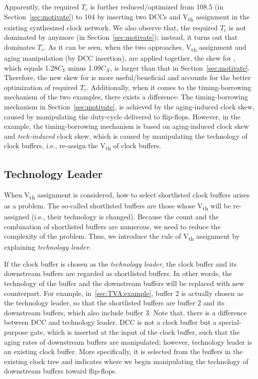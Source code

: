 Apparently, the required $T_c$ is further reduced/optimized from 108.5 (in Section~\ref{sec:motivate}) to 104 by inserting two DCCs and V\textsubscript{th} assignment in the existing synthesized clock network. We also observe that, the required $T_c$ is not dominated by  anymore (in Section~\ref{sec:motivate}); instead, it turns out that  dominates $T_c$. As it can be seen, when the two approaches, V\textsubscript{th} assignment and aging manipulation  (by DCC insertion), are applied together, the skew for , which equals 1.28$C_Y$ minus 1.09$C_X$, is larger than that in Section~\ref{sec:motivate}. Therefore, the new skew for  is more useful/beneficial and accounts for the better optimization of required $T_c$. 
Additionally, when it comes to the timing-borrowing mechanism of the two examples, there exists a difference: The timing-borrowing mechanism in Section~\ref{sec:motivate}, is achieved by the aging-induced clock skew, caused by manipulating the duty-cycle delivered to flip-flops. However, in the example, the timing-borrowing mechanism is based on aging-induced clock skew and \textit{tech-induced} clock skew, which is caused by manipulating the technology of clock buffers, i.e., re-assign the V\textsubscript{th} of clock buffers. 

\subsection{Technology Leader}
\label{sec:TVA:leader}
When V\textsubscript{th} assignment is considered, how to select shortlisted clock buffers arises as a problem. The so-called shortlisted buffers are those whose V\textsubscript{th} will be re-assigned (i.e., their technology is changed). Because the count and the combination of shortlisted buffers are numerous, we need to reduce the complexity of the problem. Thus, we introduce the rule of V\textsubscript{th} assignment by explaining \textit{technology leader}. 

If the clock buffer is chosen as the \textit{technology leader}, the clock buffer and its downstream buffers are regarded as shortlisted buffers. In other words, the technology of the buffer and the downstream buffers will be replaced with new counterpart. For example, in~\ref{sec:TVA:example}, buffer 2 is actually chosen as the technology leader, so that the shortlisted buffers are buffer 2 and its downstream buffers, which also include buffer 3. Note that, there is a difference between DCC and technology leader. DCC is not a clock buffer but a special-purpose gate, which is inserted at the input of the clock buffer, such that the aging rates of downstream buffers are manipulated; however, technology leader is an existing clock buffer. More specifically, it is selected from the buffers in the existing clock tree and indicates where we begin manipulating the technology of downstream buffers toward flip-flops.

